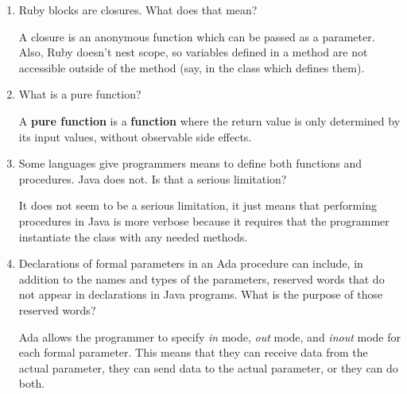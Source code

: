 \begin{enumerate}
\begin{answer}
\end{answer}


  \item Ruby blocks are closures. What does that mean?
  
\begin{answer}

  A closure is an anonymous function which can be passed as a
  parameter. Also, Ruby doesn't nest scope, so variables defined in a
  method are not accessible outside of the method (say, in the class
  which defines them).
  
\end{answer}


  \item What is a pure function?

\begin{answer}

A \textbf{pure function} is a \textbf{function} where the return value
is only determined by its input values, without observable side
effects.

\end{answer}

  \item Some languages give programmers means to define
    both functions and procedures. Java does not. Is that
    a serious limitation?

\begin{answer}

It does not seem to be a serious limitation, it just means that
performing procedures in Java is more verbose because it requires that
the programmer instantiate the class with any needed methods.

\end{answer}


  \item Declarations of formal parameters in an Ada procedure
    can include, in addition to the names and types of the
    parameters, reserved words that do not appear in declarations
    in Java programs. 
    What is the purpose of those reserved words?

\begin{answer}

    Ada allows the programmer to specify \textit{in} mode,
    \textit{out} mode, and \textit{inout} mode for each formal
    parameter.  This means that they can receive data from the actual
    parameter, they can send data to the actual parameter, or they can
    do both.
    
\end{answer}
 

\end{enumerate}
